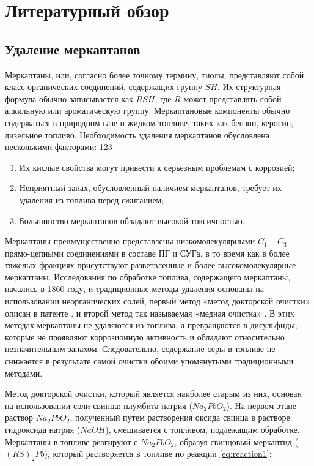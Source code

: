 \chapter{Литературный обзор} \label{ch:ch1}

\section{Удаление меркаптанов} \label{sec:ch1/sec1}

Меркаптаны, или, согласно более точному термину, тиолы, представляют собой класс органических соединений, содержащих группу $SH$. Их структурная формула обычно записывается как $RSH$, где $R$ может представлять собой алкильную или ароматическую группу. Меркаптановые компоненты обычно содержаться в природном газе и жидком топливе, таких как бензин, керосин, дизельное топливо. Необходимость удаления меркаптанов обусловлена несколькими факторами:
	123
\begin{enumerate}
	\item Их кислые свойства могут привести к серьезным проблемам с коррозией;
	\item Неприятный запах, обусловленный наличием меркаптанов, требует их удаления из топлива перед сжиганием;
	\item Большинство меркаптанов обладают высокой токсичностью.
\end{enumerate}

Меркаптаны преимущественно представлены низкомолекулярными $C _1$ – $C _3$ прямо-цепными соединениями в составе ПГ и СУГа, в то время как в более тяжелых фракциях присутствуют разветвленные и более высокомолекулярные меркаптаны. Исследования по обработке топлива, содержащего меркаптаны, начались в 1860 году, и традиционные методы удаления основаны на использовании неорганических солей, первый метод «метод докторской очистки» описан в патенте \cite{kalinowski_doctor_1959}. и второй метод так называемая «медная очистка» \cite{krause_color_1952}. В этих методах меркаптаны не удаляются из топлива, а превращаются в дисульфиды, которые не проявляют коррозионную активность и обладают относительно незначительным запахом. Следовательно, содержание серы в топливе не снижается в результате самой очистки обоими упомянутыми традиционными методами.

Метод докторской очистки, который является наиболее старым из них, основан на использовании соли свинца: плумбита натрия ($Na_2PbO_2$). На первом этапе раствор $Na_2PbO_2$, полученный путем растворения оксида свинца в растворе гидроксида натрия ($NaOH$), смешивается с топливом, подлежащим обработке. Меркаптаны в топливе реагируют с $Na_2PbO_2$, образуя свинцовый меркаптид ($(RS)_2Pb$), который растворяется в топливе по реакции \cref{eq:reaction1}:

